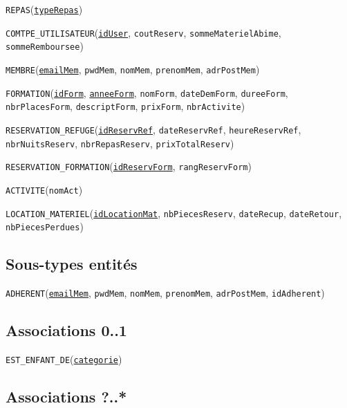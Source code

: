 \documentclass[12pt, a4paper]{article}
\newcommand\att[1]{\textnhtt{#1}}
\begin{document}
\att{REPAS}(\att{\underline{typeRepas}})

\att{COMTPE\_UTILISATEUR}(\att{\underline{idUser}}, \att{coutReserv}, \att{sommeMaterielAbime}, \att{sommeRemboursee})

\att{MEMBRE}(\att{\underline{emailMem}}, \att{pwdMem}, \att{nomMem}, \att{prenomMem}, \att{adrPostMem})

\att{FORMATION}(\att{\underline{idForm}}, \att{\underline{anneeForm}}, \att{nomForm}, \att{dateDemForm}, \att{dureeForm}, \att{nbrPlacesForm}, \att{descriptForm}, \att{prixForm}, \att{nbrActivite})

\att{RESERVATION\_REFUGE}(\att{\underline{idReservRef}}, \att{dateReservRef}, \att{heureReservRef}, \att{nbrNuitsReserv}, \att{nbrRepasReserv}, \att{prixTotalReserv})

\att{RESERVATION\_FORMATION}(\att{\underline{idReservForm}}, \att{rangReservForm})

\att{ACTIVITE}(\att{nomAct})

\att{LOCATION\_MATERIEL}(\att{\underline{idLocationMat}}, \att{nbPiecesReserv}, \att{dateRecup}, \att{dateRetour}, \att{nbPiecesPerdues})

\subsection*{Sous-types entités}

\att{ADHERENT}(\att{\underline{emailMem}}, \att{pwdMem}, \att{nomMem}, \att{prenomMem}, \att{adrPostMem}, \att{idAdherent})




\subsection*{Associations 0..1}

\att{EST\_ENFANT\_DE}(\att{\underline{categorie}})

\subsection*{Associations ?..*}

\end{document}
